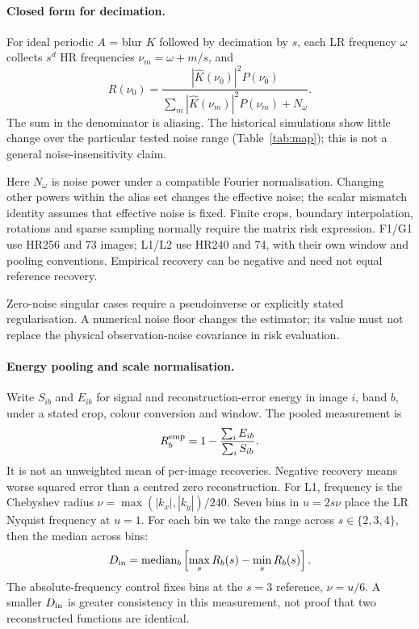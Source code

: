 \paragraph{Closed form for decimation.} For ideal periodic $A$ = blur $K$ followed by
decimation by $s$, each LR frequency $\omega$ collects $s^d$ HR frequencies
$\nu_m=\omega+m/s$, and
\begin{equation}\label{eq:alias}
R(\nu_0)=\frac{|\hat K(\nu_0)|^2P(\nu_0)}{\sum_m|\hat K(\nu_m)|^2P(\nu_m)+N_\omega}.
\end{equation}
The sum in the denominator is aliasing. The historical simulations show little change over the particular tested noise range (Table~\ref{tab:map}); this is not a general noise-insensitivity claim.

Here $N_\omega$ is noise power under a compatible Fourier normalisation.
Changing other powers within the alias set changes the effective noise;
the scalar mismatch identity assumes that effective noise is fixed.
Finite crops, boundary interpolation, rotations and sparse sampling
normally require the matrix risk expression. F1/G1 use HR256 and 73 images;
L1/L2 use HR240 and 74, with their own window and pooling conventions.
Empirical recovery can be negative and need not equal reference recovery.

Zero-noise singular cases require a pseudoinverse or explicitly stated
regularisation. A numerical noise floor changes the estimator; its value
must not replace the physical observation-noise covariance in risk evaluation.

\paragraph{Energy pooling and scale normalisation.} Write $S_{ib}$ and $E_{ib}$ for signal and reconstruction-error energy in image $i$, band $b$, under a stated crop, colour conversion and window. The pooled measurement is
\begin{equation}\label{eq:pooled}
R_b^{\rm emp}=1-\frac{\sum_i E_{ib}}{\sum_i S_{ib}}.
\end{equation}
It is not an unweighted mean of per-image recoveries. Negative recovery means worse squared error than a centred zero reconstruction. For L1, frequency is the Chebyshev radius $\nu=\max(|k_x|,|k_y|)/240$. Seven bins in $u=2s\nu$ place the LR Nyquist frequency at $u=1$. For each bin we take the range across $s\in\{2,3,4\}$, then the median across bins:
\begin{equation}\label{eq:collapse}
D_{\rm in}=\operatorname{median}_{b}\left[\max_s R_b(s)-\min_s R_b(s)\right].
\end{equation}
The absolute-frequency control fixes bins at the $s=3$ reference, $\nu=u/6$. A smaller $D_{\rm in}$ is greater consistency in this measurement, not proof that two reconstructed functions are identical.
